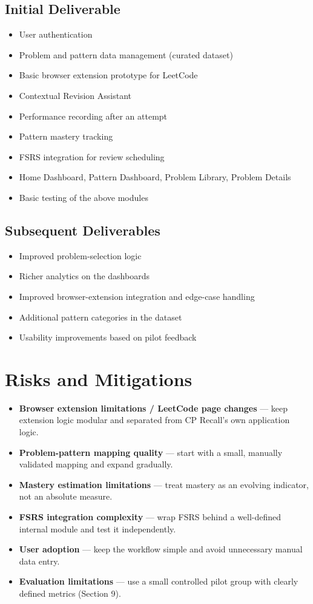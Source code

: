 \documentclass[11pt,a4paper]{article}
\begin{document}
\subsection{Initial Deliverable}
\begin{itemize}[leftmargin=0.7cm]
\item User authentication
\item Problem and pattern data management (curated dataset)
\item Basic browser extension prototype for LeetCode
\item Contextual Revision Assistant
\item Performance recording after an attempt
\item Pattern mastery tracking
\item FSRS integration for review scheduling
\item Home Dashboard, Pattern Dashboard, Problem Library, Problem Details
\item Basic testing of the above modules
\end{itemize}

\subsection{Subsequent Deliverables}
\begin{itemize}[leftmargin=0.7cm]
\item Improved problem-selection logic
\item Richer analytics on the dashboards
\item Improved browser-extension integration and edge-case handling
\item Additional pattern categories in the dataset
\item Usability improvements based on pilot feedback
\end{itemize}

\section{Risks and Mitigations}
\begin{itemize}[leftmargin=0.7cm]
\item \textbf{Browser extension limitations / LeetCode page changes} --- keep extension logic modular and separated from CP Recall's own application logic.
\item \textbf{Problem-pattern mapping quality} --- start with a small, manually validated mapping and expand gradually.
\item \textbf{Mastery estimation limitations} --- treat mastery as an evolving indicator, not an absolute measure.
\item \textbf{FSRS integration complexity} --- wrap FSRS behind a well-defined internal module and test it independently.
\item \textbf{User adoption} --- keep the workflow simple and avoid unnecessary manual data entry.
\item \textbf{Evaluation limitations} --- use a small controlled pilot group with clearly defined metrics (Section 9).
\end{itemize}
\end{document}
